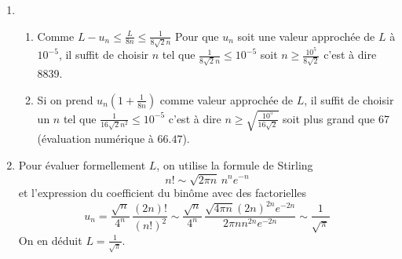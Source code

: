 \begin{enumerate}
\begin{enumerate}
 \item On peut soustraire $\frac{u_n}{8n}$ à tous les termes de l'encadrement de la question c. Il vient
\begin{displaymath}
 \frac{-u_n}{16n(n+\frac{1}{2})}\leq L-u_n-\frac{u_n}{8n}\leq \frac{L-u_n}{8n}
\end{displaymath}
\`A droite, avec l'inégalité du c., on tire  $\frac{L-u_n}{8n}\leq \frac{L}{64n^2}$. Mais de l'autre côté, on peut seulement écrire
\begin{displaymath}
 \left| \frac{-u_n}{16n(n+\frac{1}{2})}\right|\leq \frac{u_n}{16n^2} \leq \frac{L}{16n^2}
\end{displaymath}
ce qui conduit à la majoration demandée.
\end{enumerate}

 \item
\begin{enumerate}
 \item Comme $L-u_n\leq \frac{L}{8n}\leq \frac{1}{8\sqrt{2}n}$ Pour que $u_n$ soit une valeur approchée de $L$ à $10^{-5}$, il suffit de choisir $n$ tel que $\frac{1}{8\sqrt{2}n}\leq 10^{-5}$ soit $n\geq \frac{10^5}{8\sqrt{2}}$ c'est à dire 8839.
 \item Si on prend $u_n(1+\frac{1}{8n})$ comme valeur approchée de $L$, il suffit de choisir un $n$ tel que $\frac{1}{16\sqrt{2} n^2}\leq 10^{-5}$ c'est à dire $n\geq \sqrt{\frac{10^5}{16\sqrt{2}}}$ soit plus grand que 67 (évaluation numérique à $66.47$).
\end{enumerate}

 \item Pour évaluer formellement $L$, on utilise la formule de Stirling
\begin{displaymath}
 n! \sim \sqrt{2\pi n}\,n^n e^{-n}
\end{displaymath}
et l'expression du coefficient du binôme avec des factorielles
\begin{displaymath}
 u_n = \frac{\sqrt{n}}{4^n}\,\frac{(2n)!}{(n!)^2}
\sim \frac{\sqrt{n}}{4^n}\,\frac{\sqrt{4\pi n}(2n)^{2n}e^{-2n}}{2\pi n n^{2n}e^{-2n}}
\sim \frac{1}{\sqrt{\pi}}
\end{displaymath}
On en déduit $L=\frac{1}{\sqrt{\pi}}$.
\end{enumerate}
